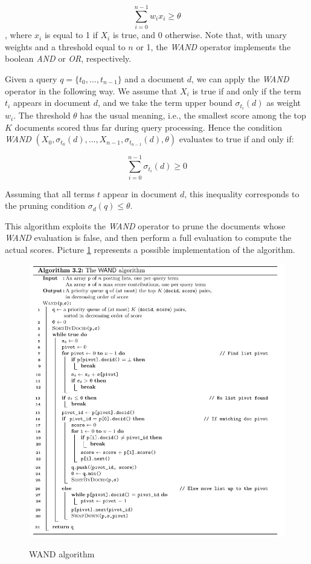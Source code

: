 $$
\sum_{i = 0}^{n-1} w_ix_i \geq \theta
$$
, where $x_i$ is equal to 1 if $X_i$ is true, and 0 otherwise. Note that, with unary weights and a threshold equal to $n$ or 1, the \textit{WAND} operator implements the boolean \textit{AND} or \textit{OR}, respectively. 

Given a query $q = \{t_0, . . . , t_{n−1}\}$ and a document $d$, we can apply the \textit{WAND} operator in the following way. We assume that $X_i$ is true if and only if the term $t_i$ appears in document $d$, and we take the term upper bound $\sigma_{t_i} (d)$ as weight $w_i$. The threshold $\theta$ has the usual meaning, i.e., the smallest score among the top $K$ documents scored thus far during query processing. Hence the condition \textit{WAND} $(X_0, \sigma_{t_0}(d), . . . ,X_{n−1}, \sigma_{t_{n−1}}(d), \theta)$ evaluates to true if and only if:

$$
\sum_{i = 0}^{n-1}\sigma_{t_i}(d) \geq 0
$$

Assuming that all terms $t$ appear in document $d$, this inequality corresponds to the pruning condition $\sigma_d(q) \leq \theta $.

This algorithm exploits the \textit{WAND} operator to prune the documents whose \textit{WAND} evaluation is false, and then perform a full evaluation to compute the actual scores. Picture \ref{wand} represents a possible implementation of the algorithm.

\begin{figure}[h!]
		\centering
		\includegraphics[scale = 1.8]{img/wand.jpg}
        \label{wand}
        \caption{WAND algorithm}
\end{figure}

